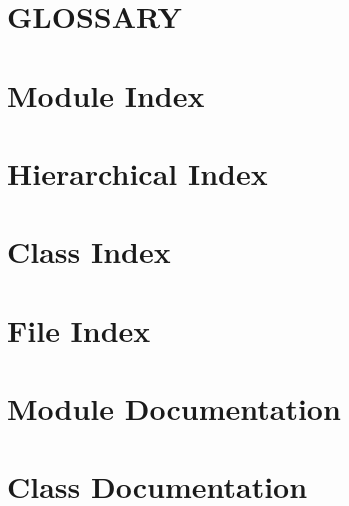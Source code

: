 \let\mypdfximage\pdfximage\def\pdfximage{\immediate\mypdfximage}\documentclass[twoside]{book}
\newcommand{\+}{\discretionary{\mbox{\scriptsize$\hookleftarrow$}}{}{}}
\begin{document}
\chapter{GLOSSARY}
\label{GLOSSARY}

\chapter{Module Index}

\chapter{Hierarchical Index}

\chapter{Class Index}

\chapter{File Index}

\chapter{Module Documentation}


































\chapter{Class Documentation}






\end{document}
